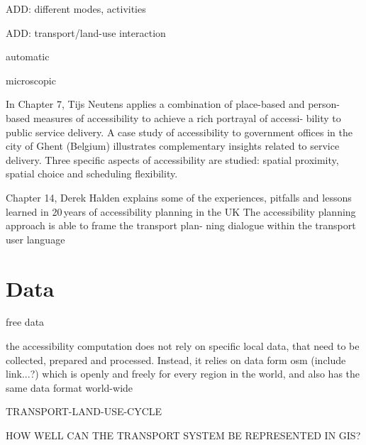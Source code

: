 ADD: different modes, activities

ADD: transport/land-use interaction

automatic

microscopic




In Chapter 7, Tijs Neutens applies a combination of place-based and person-based measures of accessibility to achieve 
a rich portrayal of accessi- bility to public service delivery. A case study of accessibility to government offices 
in the city of Ghent (Belgium) illustrates complementary insights related to service delivery. Three specific aspects 
of accessibility are studied: spatial proximity, spatial choice and scheduling flexibility.

Chapter 14, Derek Halden explains some of the experiences, pitfalls and lessons learned in 20\,years of accessibility 
planning in the UK The accessibility planning approach is able to frame the transport plan- ning dialogue within 
the transport user language 


\section{Data}
free data

the accessibility computation does not rely on specific local data, that need to be collected, prepared and processed. 
Instead, it relies on data form \gls{osm} (include link...?) which is openly and freely for every region in the world, 
and also has the same data format world-wide


TRANSPORT-LAND-USE-CYCLE

HOW WELL CAN THE TRANSPORT SYSTEM BE REPRESENTED IN GIS?




